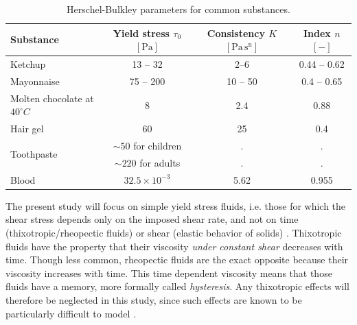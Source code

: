 \documentclass[11 pt]{report}
\begin{document}
\begin{table}[t]
    \centering
    \begin{tabular}[t]{lccc}
        \toprule
        Substance 
        & Yield stress $\tau_0$ $[\mathrm{Pa}]$ 
        & Consistency $K$ $[\mathrm{Pa \, s^n}]$ 
        & Index $n$ $[-]$\\
        \midrule
        Ketchup \cite{ketchup}       & 13 -- 32 & 2--6 & 0.44 -- 0.62 \\[2pt]
        Mayonnaise \cite{mayonnaise1,mayonnaise2} & 75 -- 200 & 10 -- 50 & 0.4 -- 0.65 \\[2pt]
        Molten chocolate at $40^\circ C$ \cite{chocolate} & 8 & 2.4 & 0.88 \\[2pt]
        Hair gel \cite{gel}                     & 60 & 25 & 0.4 \\[2pt]
        \multirow{2}{*}{Toothpaste\cite{toothpaste}}
                                     & $\sim 50$ for children & . & . \\
                                     & $\sim 220$ for adults & . & . \\[2pt]
        Blood \cite{Lee2011}         & $32.5\times 10^{-3}$ & 5.62 & 0.955 \\[2pt]
        \bottomrule
    \end{tabular}
    \caption{Herschel-Bulkley parameters for common substances.}
    \label{tab:parameters}
\end{table}%

The present study will focus on simple yield stress fluids, i.e. those for which the shear stress depends only on the imposed shear rate, and not on time (thixotropic/rheopectic fluids) or shear (elastic behavior of solids) \cite{simpleyield}. Thixotropic fluids have the property that their viscosity \textit{under constant shear} decreases with time. Though less common, rheopectic fluids are the exact opposite because their viscosity increases with 
time. This time dependent viscosity means that those fluids have a memory, more formally called \textit{hysteresis}. Any thixotropic effects will therefore be neglected in this study, since such effects are known to be particularly difficult to model \cite{Coussot,bird1987dynamics}. %
\end{document}
